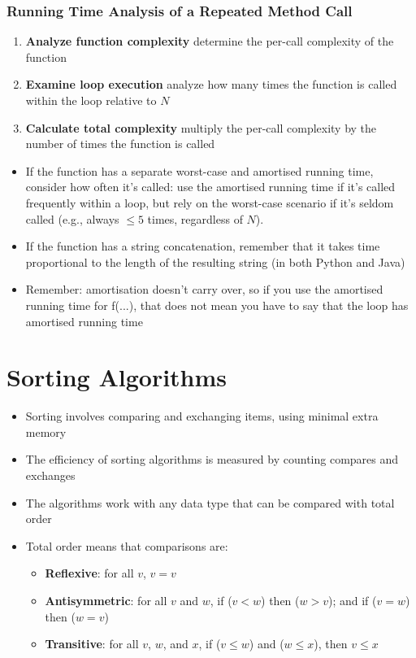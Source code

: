 \documentclass{article}
\begin{document}
\subsubsection{Running Time Analysis of a Repeated Method Call}

\begin{enumerate}
    \item \textbf{Analyze function complexity} determine the per-call complexity of the function
    \item \textbf{Examine loop execution} analyze how many times the function is called within the loop relative to $N$
    \item \textbf{Calculate total complexity} multiply the per-call complexity by the number of times the function is called
\end{enumerate}
\begin{itemize}
    \item If the function has a separate worst-case and amortised running time, consider how often it's called: use the amortised running time if it's called frequently within a loop, but rely on the worst-case scenario if it's seldom called (e.g., always \(\leq 5\) times, regardless of \(N\)).
    \item If the function has a string concatenation, remember that it takes time proportional to the length of the resulting string (in both Python and Java)
    \item Remember: amortisation doesn't carry over, so if you use the amortised running time for f(...), that does not mean you have to say that the loop has amortised running time
\end{itemize}

\section{Sorting Algorithms}

\begin{itemize}
    \item Sorting involves comparing and exchanging items, using minimal extra memory
    \item The efficiency of sorting algorithms is measured by counting compares and exchanges
    \item The algorithms work with any data type that can be compared with total order
    \item Total order means that comparisons are:
    \begin{itemize}
        \item \textbf{Reflexive}: for all $v$, $v=v$
        \item \textbf{Antisymmetric}: for all $v$ and $w$, if ($v<w$) then ($w>v$); and if ($v=w$) then ($w=v$)
        \item \textbf{Transitive}: for all $v$, $w$, and $x$, if ($v\leq w$) and ($w \leq x$), then $v \leq x$
    \end{itemize}
\end{itemize}
\end{document}
